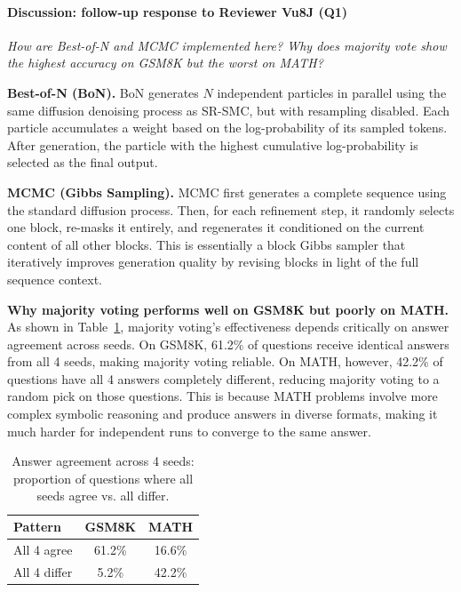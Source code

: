 \documentclass{article}
\newcommand{\review}[1]{{\color{darkblue} \textit{#1}}}
\begin{document}
\onecolumn

\paragraph{Discussion: follow-up response to Reviewer Vu8J (Q1)}

\review{How are Best-of-N and MCMC implemented here? Why does majority vote show the highest accuracy on GSM8K but the worst on MATH?}

\vspace{0.5em}

\noindent\textbf{Best-of-N (BoN).} BoN generates $N$ independent particles in parallel using the same diffusion denoising process as SR-SMC, but with resampling disabled. Each particle accumulates a weight based on the log-probability of its sampled tokens. After generation, the particle with the highest cumulative log-probability is selected as the final output.

\vspace{0.5em}

\noindent\textbf{MCMC (Gibbs Sampling).} MCMC first generates a complete sequence using the standard diffusion process. Then, for each refinement step, it randomly selects one block, re-masks it entirely, and regenerates it conditioned on the current content of all other blocks. This is essentially a block Gibbs sampler that iteratively improves generation quality by revising blocks in light of the full sequence context.

\vspace{0.5em}

\noindent\textbf{Why majority voting performs well on GSM8K but poorly on MATH.} As shown in Table~\ref{tab:vote_analysis}, majority voting's effectiveness depends critically on answer agreement across seeds. On GSM8K, 61.2\% of questions receive identical answers from all 4 seeds, making majority voting reliable. On MATH, however, 42.2\% of questions have all 4 answers completely different, reducing majority voting to a random pick on those questions. This is because MATH problems involve more complex symbolic reasoning and produce answers in diverse formats, making it much harder for independent runs to converge to the same answer.


\begin{table}[ht]
  \caption{Answer agreement across 4 seeds: proportion of questions where all seeds agree vs. all differ.}
  \label{tab:vote_analysis}
  \centering
    \begin{tabular}{l cc}
      \toprule
      Pattern & GSM8K & MATH \\
      \midrule
      All 4 agree       & 61.2\% & 16.6\% \\
      All 4 differ      &  5.2\% & 42.2\% \\
      \bottomrule
    \end{tabular}
\end{table}
\end{document}
